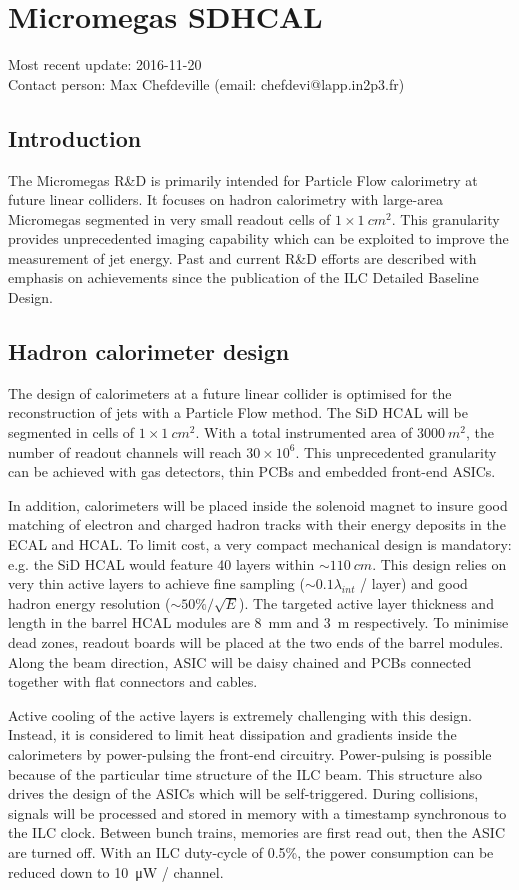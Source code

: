 \section{Micromegas SDHCAL}
Most recent update: 2016-11-20 \\
Contact person: Max Chefdeville (email: chefdevi@lapp.in2p3.fr)
\subsection{Introduction}
The Micromegas R\&D is primarily intended for Particle Flow calorimetry at future linear colliders. It focuses on hadron calorimetry with large-area Micromegas segmented in very small readout cells of $1\times\SI{1}{cm^{2}}$. This granularity provides unprecedented imaging capability which can be exploited to improve the measurement of jet energy. Past and current R\&D efforts are described with emphasis on achievements since the publication of the ILC Detailed Baseline Design.


\subsection{Hadron calorimeter design}

The design of calorimeters at a future linear collider is optimised for the reconstruction of jets with a Particle Flow method. The SiD HCAL will be segmented in cells of $1\times \SI{1}{cm^2}$. With a total instrumented area of $\SI{3000}{m^{2}}$, the number of readout channels will reach $30\times 10^{6}$. This unprecedented granularity can be achieved with gas detectors, thin PCBs and embedded front-end ASICs.

In addition, calorimeters will be placed inside the solenoid magnet to insure good matching of electron and charged hadron tracks with their energy deposits in the ECAL and HCAL. To limit cost, a very compact mechanical design is mandatory: e.g. the SiD HCAL would feature 40 layers within $\sim\SI{110}{cm}$. This design relies on very thin active layers to achieve fine sampling ($\sim 0.1 \lambda_{int}$ / layer) and good hadron energy resolution ($\sim 50\% / \sqrt{E}$). The targeted active layer thickness and length in the barrel HCAL modules are \SI{8}{mm} and \SI{3}{m} respectively. To minimise dead zones, readout boards will be placed at the two ends of the barrel modules. Along the beam direction, ASIC will be daisy chained and PCBs connected together with flat connectors and cables.

Active cooling of the active layers is extremely challenging with this design. Instead, it is considered to limit heat dissipation and gradients inside the calorimeters by power-pulsing the front-end circuitry. Power-pulsing is possible because of the particular time structure of the ILC beam. This structure also drives the design of the ASICs which will be self-triggered. During collisions, signals will be processed and stored in memory with a timestamp synchronous to the ILC clock. Between bunch trains, memories are first read out, then the ASIC are turned off. With an ILC duty-cycle of 0.5\%, the power consumption can be reduced down to \SI{10}{\micro\watt} / channel.

